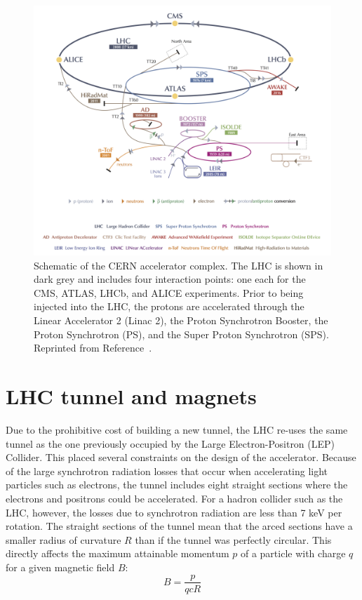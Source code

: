 \begin{figure}[h!]
	\centering
	\includegraphics[width=\linewidth]{Figures/LHC/accelerator.jpg}
       \caption{Schematic of the CERN accelerator complex. The LHC is shown in dark grey and includes four interaction points: one each for the CMS, ATLAS, LHCb, and ALICE experiments. Prior to being injected into the LHC, the protons are accelerated through the Linear Accelerator 2 (Linac 2), the Proton Synchrotron Booster, the Proton Synchrotron (PS), and the Super Proton Synchrotron (SPS). Reprinted from Reference~\cite{CDS}.}
       \label{fig:accelerator}
\end{figure}

\section{LHC tunnel and magnets}
\label{sec:tunnel}

Due to the prohibitive cost of building a new tunnel, the LHC re-uses the same tunnel as the one previously occupied by the Large Electron-Positron (LEP) Collider. This placed several constraints on the design of the accelerator. Because of the large synchrotron radiation losses that occur when accelerating light particles such as electrons, the tunnel includes eight straight sections where the electrons and positrons could be accelerated. For a hadron collider such as the LHC, however, the losses due to synchrotron radiation are less than 7 keV per rotation. The straight sections of the tunnel mean that the arced sections have a smaller radius of curvature $R$ than if the tunnel was perfectly circular. This directly affects the maximum attainable momentum $p$ of a particle with charge $q$ for a given magnetic field $B$:
\begin{equation}
B = \frac{p}{qcR}
\end{equation}

